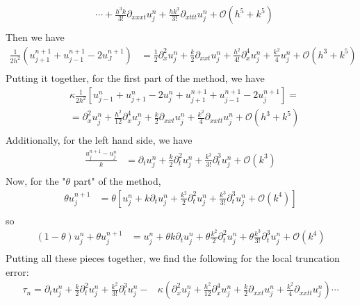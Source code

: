 \documentclass{article}
\begin{document}
\begin{itemize}
\begin{align*}
        &\cdots + \frac{h^3k}{3!}\partial_{xxxt}u_j^n + \frac{hk^3}{3!}\partial_{xttt}u_j^n + \mathcal{O}(h^5 + k^5) \\
    \end{align*}
    Then we have
    \begin{align*}
        \frac{1}{2h^2}(u_{j+1}^{n+1} + u_{j-1}^{n+1} - 2u_J^{n+1}) &= \frac{1}{2}\partial_x^2u_j^n + \frac{k}{2}\partial_{xxt}u_j^n + \frac{h^2}{4!}\partial_x^4u_j^n + \frac{k^2}{4}u_j^n + \mathcal{O}(h^3 + k^5) \\
    \end{align*}
    Putting it together, for the first part of the method, we have
    \begin{align*}
        &\kappa\frac{1}{2h^2}[u_{j-1}^n + u_{j+1}^n - 2u_j^n + u_{j+1}^{n+1} + u_{j-1}^{n+1} - 2u_j^{n+1}] = \\
        &= \partial_x^2u_j^n + \frac{h^2}{12}\partial_x^4u_j^n + \frac{k}{2}\partial_{xxt}u_j^n + \frac{k^2}{4}\partial_{xxtt}u_j^n + \mathcal{O}(h^3 + k^5) \\
    \end{align*}
    Additionally, for the left hand side, we have
    \begin{align*}
        \frac{u_j^{n+1} - u_j^n}{k} &= \partial_tu_j^n + \frac{k}{2}\partial_t^2u_j^n + \frac{k^2}{3!}\partial_t^3u_j^n + \mathcal{O}(k^3) \\
    \end{align*}
    Now, for the "$\theta$ part" of the method,
    \begin{align*}
        \theta u_j^{n+1} &= \theta\left[u_j^n + k\partial_tu_j^n + \frac{k^2}{2}\partial_t^2u_j^n + \frac{k^3}{3!}\partial_t^3u_j^n + \mathcal{O}(k^4)\right] \\
    \end{align*}
    so
    \begin{align*}
        (1-\theta)u_j^n + \theta u_j^{n+1} &= u_j^n + \theta k\partial_tu_j^n + \theta\frac{k^2}{2}\partial_t^2u_j^n + \theta\frac{k^3}{3!}\partial_t^3u_j^n + \mathcal{O}(k^4) \\
    \end{align*}
    Putting all these pieces together, we find the following for the local truncation error:
    \begin{align*}
        \tau_n = \partial_tu_j^n + \frac{k}{2}\partial_t^2u_j^n + \frac{k^2}{3!}\partial_t^3u_j^n - &\kappa\left(\partial_x^2u_j^n + \frac{h^2}{12}\partial_x^4u_j^n + \frac{k}{2}\partial_{xxt}u_j^n + \frac{k^2}{4}\partial_{xxtt}u_j^n\right) \cdots \\

\end{align*}
\end{itemize}
\end{document}

